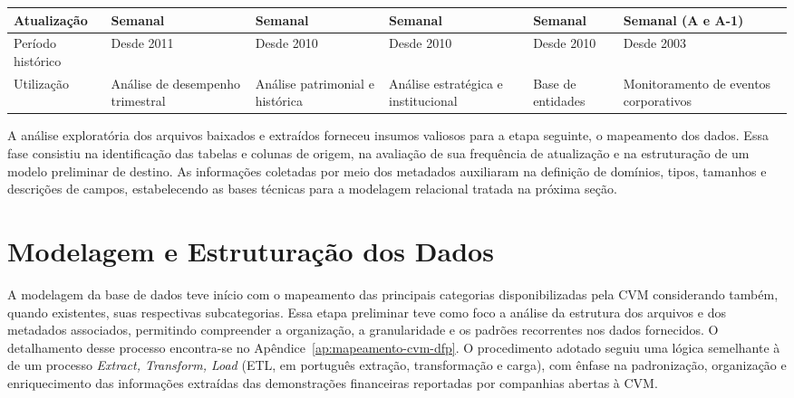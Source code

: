 \begin{board}[!htb]
\begin{varwidth}{\linewidth}
\begin{tabularx}{\textwidth}{|X|X|X|X|X|X|}
			Atualização        & Semanal                           & Semanal                            & Semanal                                         & Semanal                            & Semanal (A e A-1)                                    \\ \hline
			
			Período histórico  & Desde 2011                        & Desde 2010                         & Desde 2010                                      & Desde 2010                         & Desde 2003                                           \\ \hline
			
			Utilização         & Análise de desempenho trimestral & Análise patrimonial e histórica  & Análise estratégica e institucional           & Base de entidades & Monitoramento de eventos corporativos                \\ \hline
		\end{tabularx}
	\end{varwidth}
\end{board}


A análise exploratória dos arquivos baixados e extraídos forneceu insumos valiosos para a etapa seguinte, o mapeamento dos dados. Essa fase consistiu na identificação das tabelas e colunas de origem, na avaliação de sua frequência de atualização e na estruturação de um modelo preliminar de destino. As informações coletadas por meio dos metadados auxiliaram na definição de domínios, tipos, tamanhos e descrições de campos, estabelecendo as bases técnicas para a modelagem relacional tratada na próxima seção.



\section{Modelagem e Estruturação dos Dados}\label{sec:modelagem}

A modelagem da base de dados teve início com o mapeamento das principais categorias disponibilizadas pela CVM considerando também, quando existentes, suas respectivas subcategorias. Essa etapa preliminar teve como foco a análise da estrutura dos arquivos e dos metadados associados, permitindo compreender a organização, a granularidade e os padrões recorrentes nos dados fornecidos. O detalhamento desse processo encontra-se no Apêndice~\ref{ap:mapeamento-cvm-dfp}. O procedimento adotado seguiu uma lógica semelhante à de um processo \textit{Extract, Transform, Load} (ETL, em português extração, transformação e carga), com ênfase na padronização, organização e enriquecimento das informações extraídas das demonstrações financeiras reportadas por companhias abertas à CVM.

